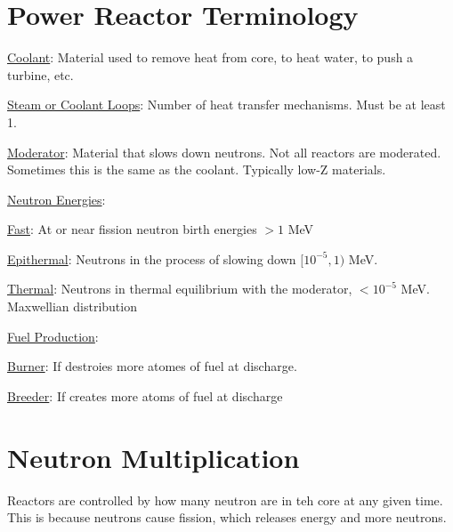 \section{Power Reactor Terminology}
\begin{labeling}
    \item [\underline{Coolant}:] Material used to remove heat from core, to
        heat water, to push a turbine, etc.
    \item [\underline{Steam or Coolant Loops}:] Number of heat transfer mechanisms.
        Must be at least 1.
    \item [\underline{Moderator}:] Material that slows down neutrons. Not all
        reactors are moderated. Sometimes this is the same as the coolant. Typically
        low-Z materials.
    \item [\underline{Neutron Energies}:]
        \begin{labeling}
            \item [\underline{Fast}:] At or near fission neutron birth energies $> 1$ MeV
            \item [\underline{Epithermal}:] Neutrons in the process of slowing down
                $[10^{-5}, 1)$ MeV.
            \item [\underline{Thermal}:] Neutrons in thermal equilibrium with the moderator,
                $< 10^{-5}$ MeV. Maxwellian distribution
        \end{labeling}
    \item [\underline{Fuel Production}:]
        \begin{labeling}
            \item [\underline{Burner}:] If destroies more atomes of fuel at discharge.
            \item [\underline{Breeder}:] If creates more atoms of fuel at discharge
        \end{labeling}
\end{labeling}


\section{Neutron Multiplication}
Reactors are controlled by how many neutron are in teh core at any given time.
This is because neutrons cause fission, which releases energy and more neutrons.

